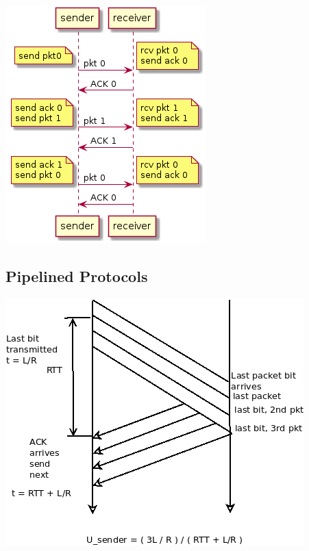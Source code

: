 \documentclass[11pt]{article}
\begin{document}
\begin{center}
\includegraphics[width=.9\linewidth]{RDT3.0.png}
\end{center}



\subsection{Pipelined Protocols}
\label{sec:org05de6e9}

\begin{center}
\includegraphics[width=.9\linewidth]{../img/pipelined_protocols.png}
\end{center}
\end{document}
